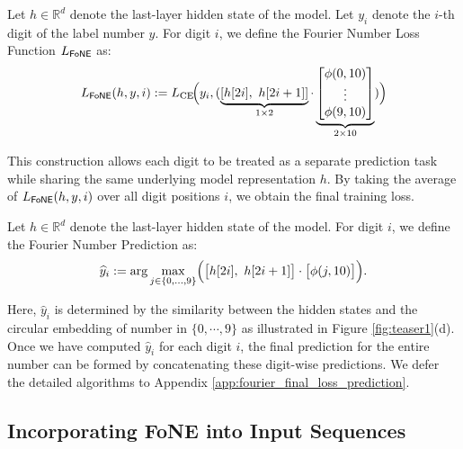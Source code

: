 \begin{definition}
Let \(h \in \mathbb{R}^{d}\) denote the last-layer hidden state of the model. Let $y_i$ denote the $i$-th digit of the label number $y$. For digit $i$, we define the Fourier Number Loss Function $L_{\FoNE}$ as:
\vspace{-1.5mm}
\begin{align*}
    L_{\FoNE} (h, y, i) :=    L_{\mathrm{CE}}\!\Bigl(y_i,  (\underbrace{[
                h[2i], ~h[2i+1]
            ]}_{1 \times 2}
            \cdot
            \underbrace{\begin{bmatrix}
                \phi(0,10)\\
                \vdots\\
                \phi(9,10)
            \end{bmatrix}}_{2\times 10})
       \Bigr)
\end{align*}
\end{definition}
\vspace{-3mm}
This construction allows each digit to be treated as a separate prediction task while sharing the same underlying model representation \(h\). By taking the average of \(L_{\FoNE}(h, y, i)\) over all digit positions \(i\), we obtain the final training loss.

\begin{definition}
Let \(h \in \mathbb{R}^{d}\) denote the last-layer hidden state of the model. For digit $i$, we define the Fourier Number Prediction as:
\vspace{-1mm}
\begin{align*}
 \hat{y}_i := 
    \arg\max_{j \in \{0,\dots,9\}}
    \Bigl(
        \big[   h[2i], ~h[2i+1]
            \big]
            \cdot
            \big[\phi(j,10)\big]
    \Bigr).
\end{align*}
\end{definition}
\vspace{-2mm}
\noindent
Here, \(\hat{y}_i\) is determined by the similarity between the hidden states and the circular embedding of number in $\{0,\cdots,9\}$ as illustrated in Figure \ref{fig:teaser1}(d). Once we have computed \(\hat{y}_i\) for each digit \(i\), the final prediction for the entire number can be formed by concatenating these digit-wise predictions. We defer the detailed algorithms to Appendix \ref{app:fourier_final_loss_prediction}.

\subsection{Incorporating FoNE into Input Sequences}\label{sec:inco}

